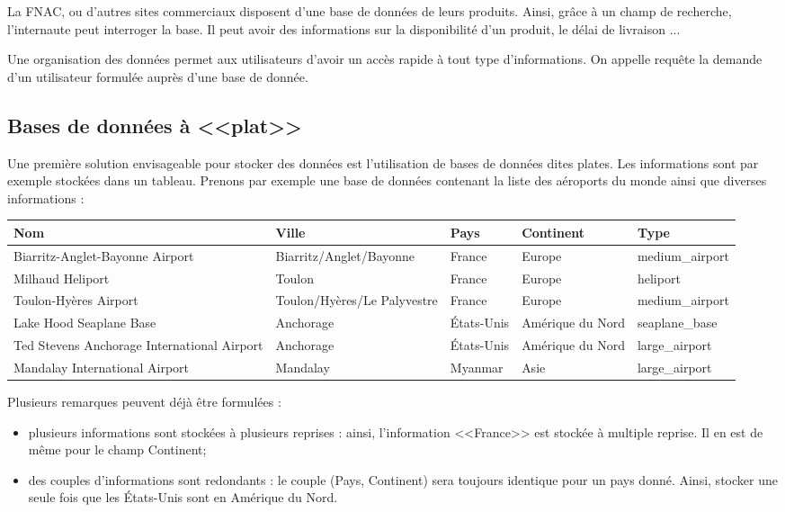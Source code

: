 \documentclass[10pt,fleqn]{article} %
\begin{document}
La FNAC, ou d'autres sites commerciaux disposent d'une base de données de leurs produits. Ainsi, grâce à un champ de recherche, l'internaute peut interroger la base. Il peut avoir des informations sur la disponibilité d'un produit, le délai de livraison ...

Une organisation des données permet aux utilisateurs d'avoir un accès rapide à tout type d'informations. On appelle requête la demande d'un utilisateur formulée auprès d'une base de donnée. 

\subsection{Bases de données à <<plat>>}
Une première solution envisageable pour stocker des données est l'utilisation de bases de données dites plates. Les informations sont par exemple stockées dans un tableau. Prenons par exemple une base de données contenant la liste des aéroports du monde ainsi que diverses informations : 
\begin{center}
\begin{tabular}{p{4cm}llll}
\hline
Nom & Ville & Pays & Continent  & Type \\
\hline
\hline
Biarritz-Anglet-Bayonne Airport & Biarritz/Anglet/Bayonne & France & Europe & medium\_airport \\
Milhaud Heliport & Toulon & France & Europe & heliport \\
Toulon-Hyères Airport & Toulon/Hyères/Le Palyvestre & France & Europe & medium\_airport \\
Lake Hood Seaplane Base & Anchorage & États-Unis & Amérique du Nord & seaplane\_base\\
Ted Stevens Anchorage International Airport & Anchorage & États-Unis & Amérique du Nord & large\_airport\\
Mandalay International Airport & Mandalay & Myanmar & Asie & large\_airport\\
\hline
\end{tabular}
\end{center}

Plusieurs remarques peuvent déjà être formulées : 
\begin{itemize}
\item plusieurs informations sont stockées à plusieurs reprises : ainsi, l'information <<France>> est stockée à multiple reprise. Il en est de même pour le champ Continent;
\item des couples d'informations sont redondants : le couple (Pays, Continent) sera toujours identique pour un pays donné. Ainsi, stocker une seule fois que les États-Unis sont en Amérique du Nord.
\end{itemize}
\end{document}
